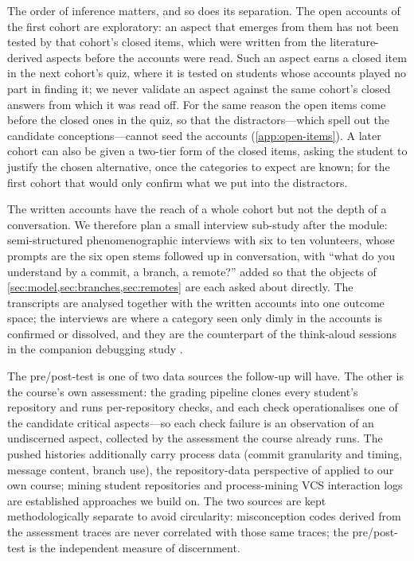 The order of inference matters, and so does its separation.
The open accounts of the first cohort are exploratory: an aspect that
emerges from them has not been tested by that cohort's closed items,
which were written from the literature-derived aspects before the
accounts were read.
Such an aspect earns a closed item in the next cohort's quiz, where it
is tested on students whose accounts played no part in finding it; we
never validate an aspect against the same cohort's closed answers from
which it was read off.
For the same reason the open items come before the closed ones in the
quiz, so that the distractors---which spell out the candidate
conceptions---cannot seed the accounts (\cref{app:open-items}).
A later cohort can also be given a two-tier form of the closed items,
asking the student to justify the chosen alternative, once the categories
to expect are known; for the first cohort that would only confirm what
we put into the distractors.

The written accounts have the reach of a whole cohort but not the depth
of a conversation.
We therefore plan a small interview sub-study after the module:
semi-structured phenomenographic interviews with six to ten volunteers,
whose prompts are the six open stems followed up in conversation, with
\enquote{what do you understand by a commit, a branch, a remote?} added
so that the objects of \cref{sec:model,sec:branches,sec:remotes} are
each asked about directly.
The transcripts are analysed together with the written accounts into one
outcome space; the interviews are where a category seen only dimly in the
accounts is confirmed or dissolved, and they are the counterpart of the
think-aloud sessions in the companion debugging study \autocite{VTDebug}.

The pre/post-test is one of two data sources the follow-up will have.
The other is the course's own assessment: the grading pipeline clones
every student's repository and runs per-repository checks, and each
check operationalises one of the candidate critical aspects---so each
check failure is an observation of an undiscerned aspect, collected by
the assessment the course already runs.
The pushed histories additionally carry process data (commit
granularity and timing, message content, branch use), the
repository-data perspective of \textcite{Cochez2013DVCSUsage} applied
to our own course; mining student repositories
\autocite{Hamer2021GitMetrics} and process-mining VCS interaction logs
\autocite{Ardimento2022ProcessMining} are established approaches we
build on.
The two sources are kept methodologically separate to avoid
circularity: misconception codes derived from the assessment traces are
never correlated with those same traces; the pre/post-test is the
independent measure of discernment.

